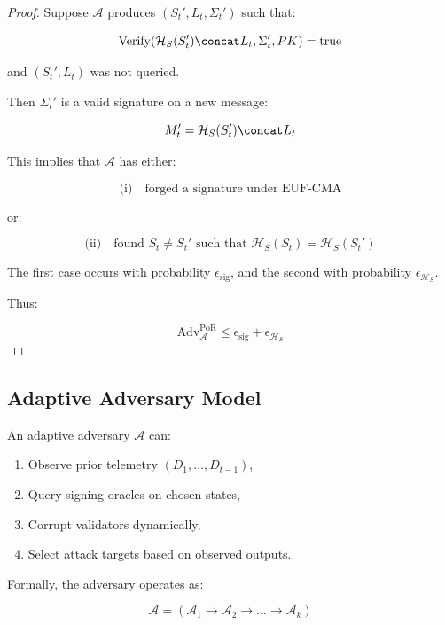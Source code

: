 \begin{proof}
Suppose $\mathcal{A}$ produces $(S_t', L_t, \Sigma_t')$ such that:

\[
\text{Verify}(\mathcal{H}_S(S_t') \concat L_t, \Sigma_t', PK) = \text{true}
\]

and $(S_t', L_t)$ was not queried.

Then $\Sigma_t'$ is a valid signature on a new message:

\[
M_t' = \mathcal{H}_S(S_t') \concat L_t
\]

This implies that $\mathcal{A}$ has either:

\begin{equation}
\text{(i)} \quad \text{forged a signature under EUF-CMA}
\end{equation}

or:

\begin{equation}
\text{(ii)} \quad \text{found } S_t \neq S_t' \text{ such that } \mathcal{H}_S(S_t) = \mathcal{H}_S(S_t')
\end{equation}

The first case occurs with probability $\epsilon_{\text{sig}}$, and the second with probability $\epsilon_{\mathcal{H}_S}$.

Thus:

\[
\text{Adv}_{\mathcal{A}}^{\text{PoR}} \leq \epsilon_{\text{sig}} + \epsilon_{\mathcal{H}_S}
\]
\end{proof}

\subsection{Adaptive Adversary Model}

An adaptive adversary $\mathcal{A}$ can:

\begin{enumerate}
\item Observe prior telemetry $(D_1, \dots, D_{t-1})$,
\item Query signing oracles on chosen states,
\item Corrupt validators dynamically,
\item Select attack targets based on observed outputs.
\end{enumerate}

Formally, the adversary operates as:

\begin{equation}
\mathcal{A} = (\mathcal{A}_1 \rightarrow \mathcal{A}_2 \rightarrow \dots \rightarrow \mathcal{A}_k)
\end{equation}

